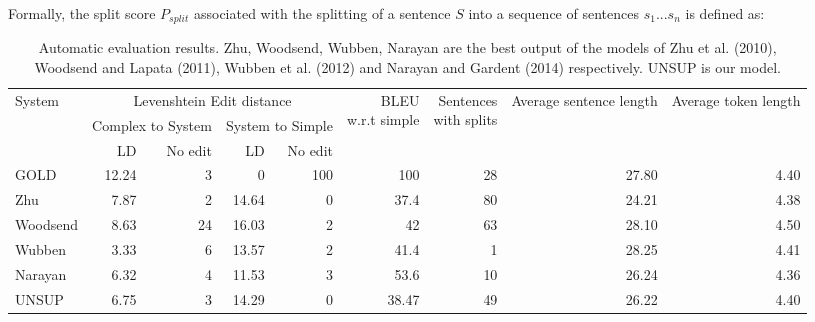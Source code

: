 \documentclass[11pt,a4paper]{article}
\begin{document}
Formally, the split score $P_{split}$ associated with the splitting of
a sentence $S$ into a sequence of sentences $s_1 ... s_n$ is defined
as:

\begin{table*}[htbp]
  \begin{center}
    \begin{footnotesize}
      \begin{tabular}{|p{1.2cm}|rr|rr|r|r|r|r|}\hline
        
        \multirow{3}{*}{System} &
        \multicolumn{4}{|c|}{\parbox{4cm}{Levenshtein Edit distance}}
        & \multirow{3}{*}{\parbox{1.5cm}{BLEU \\ w.r.t simple}} &
        \multirow{3}{*}{\parbox{1.3cm}{Sentences \\ with splits}} &
        \multirow{3}{*}{\parbox{1.2cm}{Average sentence length}} &
        \multirow{3}{*}{\parbox{1.2cm}{Average token length}}
        \\ \cline{2-5}
        & \multicolumn{2}{|c|}{\parbox{2cm}{Complex to System}} &
        \multicolumn{2}{|c|}{\parbox{2cm}{System to Simple}} & & & &\\ \cline{2-5}
        & LD & No edit & LD & No edit & & &  & \\ \hline
        GOLD & 12.24 & 3 & 0 & 100 & 100 & 28 & 27.80 & 4.40 \\ 
        Zhu & 7.87 & 2 & 14.64 & 0 & 37.4 & 80 & 24.21 & 4.38\\
        Woodsend & 8.63 & 24 & 16.03 & 2 & 42 & 63 & 28.10 & 4.50\\
        Wubben & 3.33 & 6 & 13.57 & 2 & 41.4 & 1 & 28.25 & 4.41\\
        Narayan & 6.32 & 4 & 11.53 & 3 & 53.6 & 10 & 26.24 & 4.36\\\hline
        UNSUP & 6.75 & 3 & 14.29 & 0 & 38.47 & 49 & 26.22 & 4.40 \\\hline
      \end{tabular}
      \caption{\small Automatic evaluation results.  Zhu, Woodsend,
        Wubben, Narayan are the best output of the models of Zhu et
        al. (2010), Woodsend and Lapata (2011), Wubben et al. (2012)
        and Narayan and Gardent (2014) respectively. UNSUP is our
        model.}\label{tab:autoeval}
      \vspace{-0.5cm}
    \end{footnotesize}    
  \end{center}
\end{table*}
\end{document}
